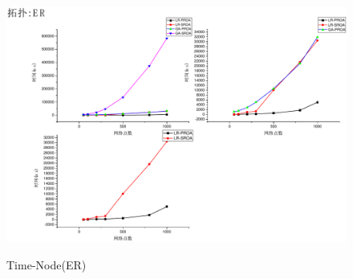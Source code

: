 \begin{figure}
\setlength{\belowcaptionskip}{-0.1cm}
\begin{center}
{\includegraphics[width=0.8 \textwidth]{figures/TI-ER-NO.pdf}}
\end{center}
\caption{{\footnotesize{Time-Node(ER)}}}
\label{TI-ER-NO}
\end{figure}
